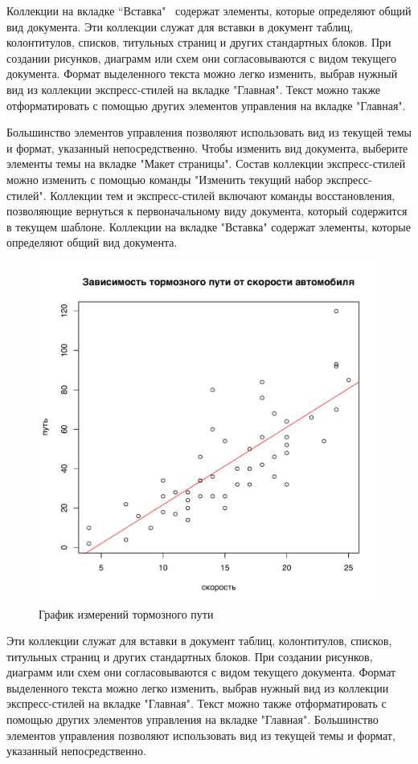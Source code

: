 \documentclass{article}
\begin{document}
Коллекции на вкладке ``Вставка" \ содержат элементы, которые определяют общий вид документа. Эти коллекции служат для вставки в документ таблиц, колонтитулов, списков, титульных страниц и других стандартных блоков. При создании рисунков, диаграмм или схем они согласовываются с видом текущего документа. Формат выделенного текста можно легко изменить, выбрав нужный вид из коллекции экспресс-стилей на вкладке "Главная". Текст можно также отформатировать с помощью других элементов управления на вкладке "Главная".

Большинство элементов управления позволяют использовать вид из текущей темы и формат, указанный непосредственно. Чтобы изменить вид документа, выберите элементы темы на вкладке "Макет страницы". Состав коллекции экспресс-стилей можно изменить с помощью команды "Изменить текущий набор экспресс-стилей". Коллекции тем и экспресс-стилей включают команды восстановления, позволяющие вернуться к первоначальному виду документа, который содержится в текущем шаблоне. Коллекции на вкладке "Вставка" содержат элементы, которые определяют общий вид документа.
\begin{figure}[t]
\centering
\includegraphics[width=0.7\linewidth,trim=0 5mm 0 2cm ,clip=true]{plot_cars_distance}
\caption{График измерений тормозного пути}
\label{fig:plot_cars_distance}
\end{figure}



Эти коллекции служат для вставки в документ таблиц, колонтитулов, списков, титульных страниц и других стандартных блоков. При создании рисунков, диаграмм или схем они согласовываются с видом текущего документа. Формат выделенного текста можно легко изменить, выбрав нужный вид из коллекции экспресс-стилей на вкладке "Главная". Текст можно также отформатировать с помощью других элементов управления на вкладке "Главная". Большинство элементов управления позволяют использовать вид из текущей темы и формат, указанный непосредственно.
\end{document}

